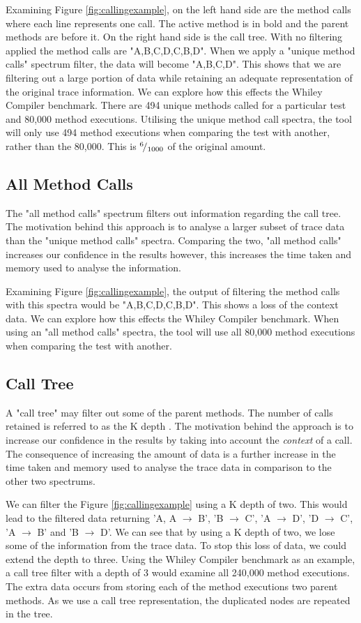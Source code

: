 Examining Figure \ref{fig:callingexample}, on the left hand side are the method calls where each line represents one call. The active method is in bold and the parent methods are before it. On the right hand side is the call tree. With no filtering applied the method calls are "A,B,C,D,C,B,D". When we apply a "unique method calls" spectrum filter, the data will become "A,B,C,D". This shows that we are filtering out a large portion of data while retaining an adequate representation of the original trace information. We can explore how this effects the Whiley Compiler benchmark. There are 494 unique methods called for a particular test and 80,000 method executions. Utilising the unique method call spectra, the tool will only use 494 method executions when comparing the test with another, rather than the 80,000. This is ${}^{6}\!/_{1000}$ of the original amount. 

\subsection{All Method Calls}
The "all method calls" spectrum filters out information regarding the call tree. The motivation behind this approach is to analyse a larger subset of trace data than the "unique method calls" spectra. Comparing the two, "all method calls" increases our confidence in the results however, this increases the time taken and memory used to analyse the information.

Examining Figure \ref{fig:callingexample}, the output of filtering the method calls with this spectra would be "A,B,C,D,C,B,D". This shows a loss of the context data. We can explore how this effects the Whiley Compiler benchmark. When using an "all method calls" spectra, the tool will use all 80,000 method executions when comparing the test with another.

\subsection{Call Tree}
A "call tree" may filter out some of the parent methods. The number of calls retained is referred to as the K depth \cite{Zhuang06accurate}. The motivation behind the approach is to increase our confidence in the results by taking into account the \textit{context} of a call. The consequence of increasing the amount of data is a further increase in the time taken and memory used to analyse the trace data in comparison to the other two spectrums.

We can filter the Figure \ref{fig:callingexample} using a K depth of two. This would lead to the filtered data returning 'A, A $\rightarrow$ B', 'B $\rightarrow$ C', 'A $\rightarrow$ D', 'D $\rightarrow$ C', 'A $\rightarrow$ B' and 'B $\rightarrow$ D'. We can see that by using a K depth of two, we lose some of the information from the trace data. To stop this loss of data, we could extend the depth to three. Using the Whiley Compiler benchmark as an example, a call tree filter with a depth of 3 would examine all 240,000 method executions. The extra data occurs from storing each of the method executions two parent methods. As we use a call tree representation, the duplicated nodes are repeated in the tree. 

